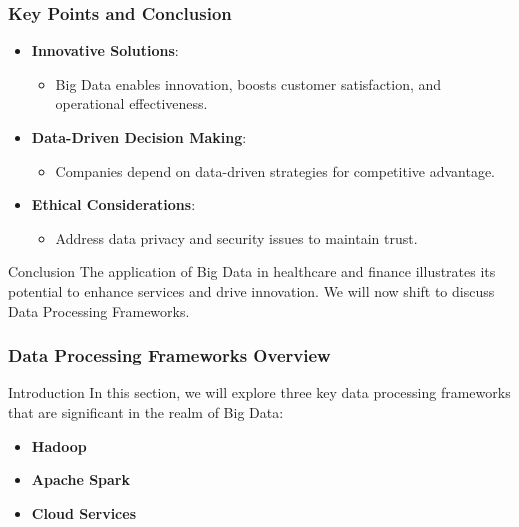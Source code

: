 \documentclass[aspectratio=169]{beamer}
\begin{document}
\begin{frame}[fragile]
    \frametitle{Key Points and Conclusion}
    \begin{itemize}
        \item \textbf{Innovative Solutions}:
        \begin{itemize}
            \item Big Data enables innovation, boosts customer satisfaction, and operational effectiveness.
        \end{itemize}
        \item \textbf{Data-Driven Decision Making}:
        \begin{itemize}
            \item Companies depend on data-driven strategies for competitive advantage.
        \end{itemize}
        \item \textbf{Ethical Considerations}:
        \begin{itemize}
            \item Address data privacy and security issues to maintain trust.
        \end{itemize}
    \end{itemize}
    \begin{block}{Conclusion}
        The application of Big Data in healthcare and finance illustrates its potential to enhance services and drive innovation. We will now shift to discuss Data Processing Frameworks.
    \end{block}
\end{frame}

\begin{frame}[fragile]
    \frametitle{Data Processing Frameworks Overview}
    \begin{block}{Introduction}
        In this section, we will explore three key data processing frameworks that are significant in the realm of Big Data:
        \begin{itemize}
            \item \textbf{Hadoop}
            \item \textbf{Apache Spark}
            \item \textbf{Cloud Services}
        \end{itemize}
    \end{block}
\end{frame}
\end{document}
